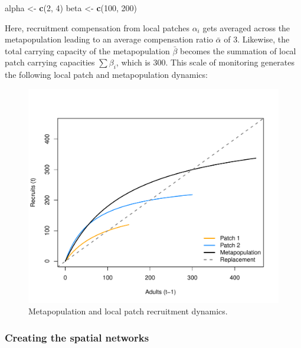\documentclass[]{article}
\newenvironment{Shaded}{\begin{snugshade}}{\end{snugshade}}
\newcommand{\DecValTok}[1]{\textcolor[rgb]{0.00,0.00,0.81}{#1}}
\newcommand{\KeywordTok}[1]{\textcolor[rgb]{0.13,0.29,0.53}{\textbf{#1}}}
\newcommand{\NormalTok}[1]{#1}
\newcommand{\StringTok}[1]{\textcolor[rgb]{0.31,0.60,0.02}{#1}}
\begin{document}
\begin{Shaded}
\begin{Highlighting}[]
\NormalTok{alpha <-}\StringTok{ }\KeywordTok{c}\NormalTok{(}\DecValTok{2}\NormalTok{, }\DecValTok{4}\NormalTok{)}
\NormalTok{beta <-}\StringTok{ }\KeywordTok{c}\NormalTok{(}\DecValTok{100}\NormalTok{, }\DecValTok{200}\NormalTok{)}
\end{Highlighting}
\end{Shaded}

Here, recruitment compensation from local patches \(\alpha_i\) gets
averaged across the metapopulation leading to an average compensation
ratio \(\bar{\alpha}\) of 3. Likewise, the total carrying capacity of
the metapopulation \(\bar{\beta}\) becomes the summation of local patch
carrying capacities \(\sum\beta_i\), which is 300. This scale of
monitoring generates the following local patch and metapopulation
dynamics:

\begin{figure}[H]

{\centering \includegraphics{Managing_for_ecological_surprises_in_metapopulations_makeHTML_files/figure-latex/recruit curves-1} 

}

\caption{Metapopulation and local patch recruitment dynamics.}\label{fig:recruit curves}
\end{figure}

\hypertarget{creating-the-spatial-networks}{%
\subsubsection{Creating the spatial
networks}\label{creating-the-spatial-networks}}
\end{document}
